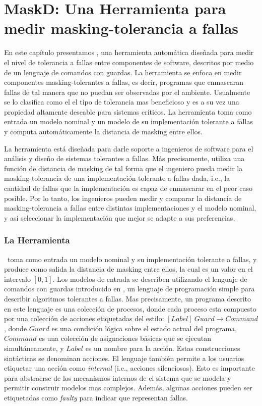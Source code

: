 \chapter{MaskD: Una Herramienta para medir masking-tolerancia a fallas}
\label{cap:maskD}

En este capítulo presentamos {\MaskD}, una herramienta automática diseñada para medir el nivel de tolerancia a fallas entre componentes de software, 
descritos por medio de un lenguaje de comandos con guardas.
La herramienta se enfoca en medir componentes masking-tolerantes a fallas, es decir, programas que enmascaran fallas de tal manera que no puedan ser observadas por el ambiente. Usualmente se lo clasifica como el el tipo de tolerancia mas beneficioso y es a su vez una propiedad altamente deseable para sistemas críticos. 
La herramienta toma como entrada un modelo nominal y un modelo de su implementación tolerante a fallas y computa automáticamente la distancia de masking entre ellos. 

La herramienta está diseñada para darle soporte a ingenieros de software para el análisis y diseño de sistemas tolerantes a fallas. Más precisamente, utiliza una función de distancia de masking de tal forma que el ingeniero pueda medir la masking-tolerancia de una implementación tolerante a fallas dada, i.e., la cantidad de fallas que la implementación es capaz de enmascarar en el peor caso posible. 
Por lo tanto, los ingenieros pueden medir y comparar la distancia de masking-tolerancia a fallas entre distintas implementaciones y el modelo nominal, y así seleccionar la implementación que mejor se adapte a sus preferencias.

\subsection{La Herramienta} \label{sec:mask_sec}

\MaskD~toma como entrada un modelo nominal y su implementación tolerante a fallas, y produce como salida la distancia de masking entre ellos, la cual es un valor en el intervalo $[0,1]$.
Los modelos de entrada se describen utilizando el lenguaje de comandos con guardas introducido en \cite{AroraGouda93}, un lenguaje de programación simple para describir algoritmos tolerantes a fallas.
Mas precisamente, un programa descrito en este lenguaje es una colección de procesos, donde cada proceso esta compuesto por una colección de acciones etiquetadas del estilo: $[Label]~Guard \rightarrow Command$, donde $Guard$ es una condición lógica sobre el estado actual del programa, $Command$ es una colección de asignaciones básicas que se ejecutan simultáneamente, y $Label$ es un nombre para la acción.
Estas construcciones sintácticas se denominan acciones. El lenguaje también permite a los usuarios etiquetar una acción como \emph{internal} (i.e., acciones silenciosas). Esto es importante para abstraerse de los mecanismos internos de el sistema que se modela y permitir construir modelos mas complejos. Además, algunas acciones pueden ser etiquetadas como \emph{faulty} para indicar que representan fallas. 


